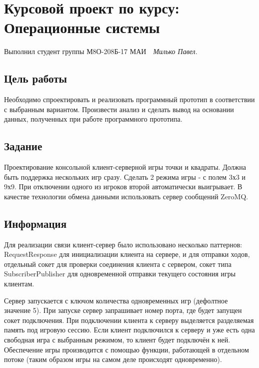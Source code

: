 \documentclass[12pt]{article}
\begin{document}
\section*{\centering Курсовой проект по курсу:\\ Операционные системы}

\noindent Выполнил студент группы М8О-208Б-17 МАИ \,\, \textit{Милько Павел}.

\subsection*{Цель работы}

\noindent Необходимо спроектировать и реализовать программный прототип в соответствии с
выбранным вариантом. Произвести анализ и сделать вывод на основании данных,
полученных при работе программного прототипа.


\subsection*{Задание}

Проектирование консольной клиент-серверной игры точки и квадраты. Должна быть поддержка нескольких игр сразу. Сделать 2 режима игры - с полем 3х3 и 9х9. При отключении одного из игроков второй автоматически выигрывает. В качестве технологии обмена данными использовать сервер сообщений ZeroMQ.

\subsection*{Информация}

Для реализации связи клиент-сервер было использовано несколько паттернов:  RequestResponse для инициализации клиента на сервере, и для отправки ходов, отдельный сокет для проверки соединения клиента с сервером, сокет типа SubscriberPublisher для одновременной отправки текущего состояния игры клиентам.

Сервер запускается с ключом количества одновременных игр (дефолтное значение 5). При запуске сервер запрашивает номер порта, где будет запущен сокет подключения. При подключении клиента к серверу выделяется разделяемая память под игровую сессию. Если клиент подключился к серверу и уже есть одна свободная игра с выбранным режимом, то клиент будет подключён к ней. Обеспечение игры производится  с помощью функции, работающей в отдельном потоке (таким образом игры на самом деле происходят одновременно). 
\end{document}
